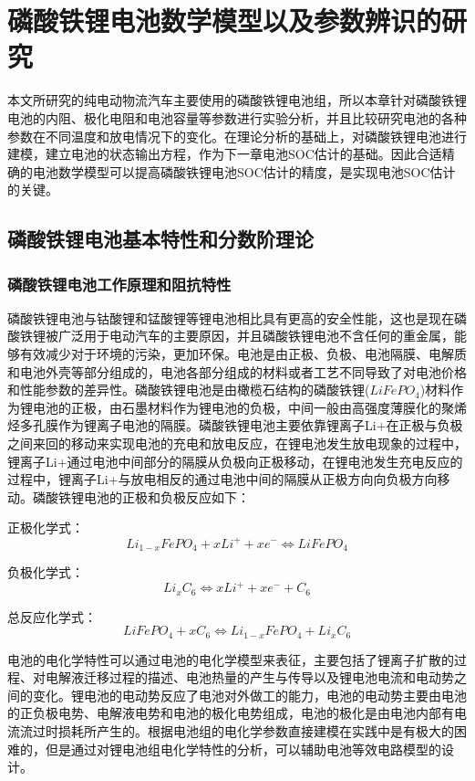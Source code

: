 
\chapter{磷酸铁锂电池数学模型以及参数辨识的研究}
本文所研究的纯电动物流汽车主要使用的磷酸铁锂电池组，所以本章针对磷酸铁锂电池的内阻、极化电阻和电池容量等参数进行实验分析，并且比较研究电池的各种参数在不同温度和放电情况下的变化。在理论分析的基础上，对磷酸铁锂电池进行建模，建立电池的状态输出方程，作为下一章电池SOC估计的基础。因此合适精确的电池数学模型可以提高磷酸铁锂电池SOC估计的精度，是实现电池SOC估计的关键。
\section{磷酸铁锂电池基本特性和分数阶理论}
\subsection{磷酸铁锂电池工作原理和阻抗特性}
磷酸铁锂电池与钴酸锂和锰酸锂等锂电池相比具有更高的安全性能，这也是现在磷酸铁锂被广泛用于电动汽车的主要原因，并且磷酸铁锂电池不含任何的重金属，能够有效减少对于环境的污染，更加环保。电池是由正极、负极、电池隔膜、电解质和电池外壳等部分组成的，电池各部分组成的材料或者工艺不同导致了对电池价格和性能参数的差异性。磷酸铁锂电池是由橄榄石结构的磷酸铁锂($LiFeP{O_4}$)材料作为锂电池的正极，由石墨材料作为锂电池的负极，中间一般由高强度薄膜化的聚烯烃多孔膜作为锂离子电池的隔膜。磷酸铁锂电池主要依靠锂离子Li+在正极与负极之间来回的移动来实现电池的充电和放电反应，在锂电池发生放电现象的过程中，锂离子Li+通过电池中间部分的隔膜从负极向正极移动，在锂电池发生充电反应的过程中，锂离子Li+与放电相反的通过电池中间的隔膜从正极方向向负极方向移动。磷酸铁锂电池的正极和负极反应如下：

正极化学式：
\begin{equation}
L{i_{1 - x}}FeP{O_4} + xL{i^ + } + x{e^ - } \Leftrightarrow LiFeP{O_4}
\end{equation}

负极化学式：
\begin{equation}
L{i_x}{C_6} \Leftrightarrow xL{i^ + } + x{e^ - } + {C_6}
\end{equation}

总反应化学式：
\begin{equation}
LiFeP{O_4} + x{C_6} \Leftrightarrow L{i_{1 - x}}FeP{O_4} + L{i_x}{C_6}
\end{equation}

	电池的电化学特性可以通过电池的电化学模型来表征，主要包括了锂离子扩散的过程、对电解液迁移过程的描述、电池热量的产生与传导以及锂电池电流和电动势之间的变化。锂电池的电动势反应了电池对外做工的能力，电池的电动势主要由电池的正负极电势、电解液电势和电池的极化电势组成，电池的极化是由电池内部有电流流过时损耗所产生的。根据电池组的电化学参数直接建模在实践中是有极大的困难的，但是通过对锂电池组电化学特性的分析，可以辅助电池等效电路模型的设计。

